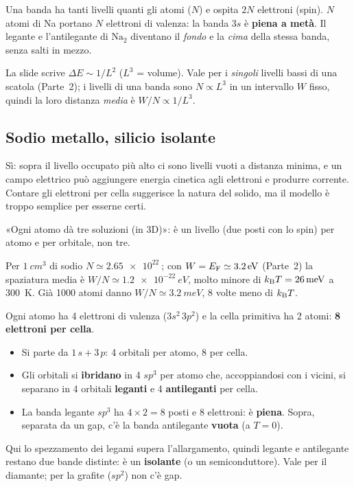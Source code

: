 \documentclass[11pt,a4paper]{article}
\begin{document}
\begin{chiave}
Una banda ha tanti livelli quanti gli atomi ($N$) e ospita $2N$ elettroni (spin). $N$ atomi di Na portano $N$ elettroni di valenza: la banda
$3s$ è \textbf{piena a metà}. Il legante e l'antilegante di $\mathrm{Na_2}$ diventano il \emph{fondo} e la \emph{cima} della stessa banda, senza salti in mezzo.
\end{chiave}

\begin{osservazione}
La slide scrive $\Delta E\sim1/L^2$ ($L^3$ = volume). Vale per i \emph{singoli} livelli bassi di una scatola (Parte~2); i livelli di una banda sono
$N\propto L^3$ in un intervallo $W$ fisso, quindi la loro distanza \emph{media} è $W/N\propto1/L^3$.
\end{osservazione}

\subsection{Sodio metallo, silicio isolante}
Sì: sopra il livello occupato più alto ci sono livelli vuoti a distanza minima, e un campo elettrico può aggiungere energia cinetica agli elettroni e
produrre corrente. Contare gli elettroni per cella suggerisce la natura del solido, ma il modello è troppo semplice per esserne certi.

\begin{osservazione}
«Ogni atomo dà tre soluzioni (in 3D)»: è un livello (due posti con lo spin) per atomo e per orbitale, non tre.
\end{osservazione}

\begin{esempio}
Per $\SI{1}{cm^3}$ di sodio $N\simeq\SI{2.65e22}{}$; con $W=E_{\mathrm F}\simeq\SI{3.2}{eV}$ (Parte~2) la spaziatura media è $W/N\simeq\SI{1.2e-22}{eV}$, molto
minore di $k_{\mathrm B} T=\SI{26}{meV}$ a \SI{300}{K}. Già 1000 atomi danno $W/N\simeq\SI{3.2}{meV}$, 8 volte meno di $k_{\mathrm B} T$.
\end{esempio}

Ogni atomo ha 4 elettroni di valenza ($3s^2\,3p^2$) e la cella primitiva ha 2 atomi: \textbf{8 elettroni per cella}.
\begin{itemize}[leftmargin=*]
\item Si parte da $1\,s+3\,p$: 4 orbitali per atomo, 8 per cella.
\item Gli orbitali si \textbf{ibridano} in 4 $sp^3$ per atomo che, accoppiandosi con i vicini, si separano in 4 orbitali \textbf{leganti} e 4
\textbf{antileganti} per cella.
\item La banda legante $sp^3$ ha $4\times2=8$ posti e 8 elettroni: è \textbf{piena}. Sopra, separata da un gap, c'è la banda antilegante
\textbf{vuota} (a $T=0$).
\end{itemize}
Qui lo spezzamento dei legami supera l'allargamento, quindi legante e antilegante restano due bande distinte: è un \textbf{isolante} (o un
semiconduttore). Vale per il diamante; per la grafite ($sp^2$) non c'è gap.
\end{document}

